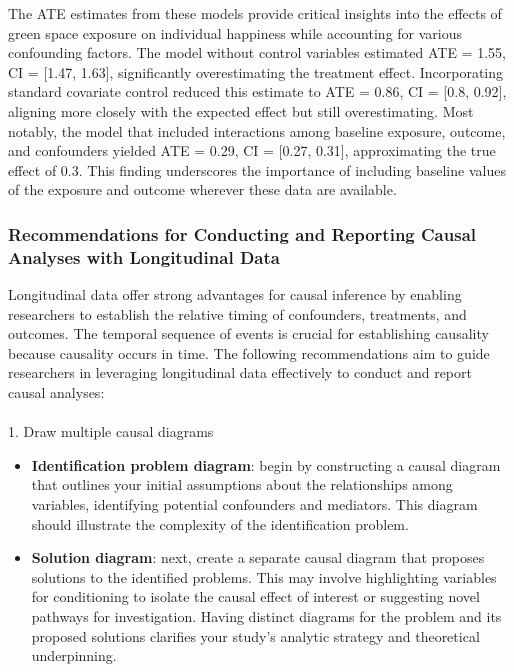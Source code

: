 \documentclass[
  single column]{article}
\makeatletter
\let\oldparagraph\paragraph
\renewcommand{\paragraph}{
    \@ifstar
      \xxxParagraphStar
      \xxxParagraphNoStar
  }
\newcommand{\xxxParagraphStar}[1]{\oldparagraph*{#1}\mbox{}}
\newcommand{\xxxParagraphNoStar}[1]{\oldparagraph{#1}\mbox{}}
\providecommand{\tightlist}{%
  \setlength{\itemsep}{0pt}\setlength{\parskip}{0pt}}\usepackage{longtable,booktabs,array}
\makeatother
\begin{document}
The ATE estimates from these models provide critical insights into the
effects of green space exposure on individual happiness while accounting
for various confounding factors. The model without control variables
estimated ATE = 1.55, CI = {[}1.47, 1.63{]}, significantly
overestimating the treatment effect. Incorporating standard covariate
control reduced this estimate to ATE = 0.86, CI = {[}0.8, 0.92{]},
aligning more closely with the expected effect but still overestimating.
Most notably, the model that included interactions among baseline
exposure, outcome, and confounders yielded ATE = 0.29, CI = {[}0.27,
0.31{]}, approximating the true effect of 0.3. This finding underscores
the importance of including baseline values of the exposure and outcome
wherever these data are available.

\subsubsection{Recommendations for Conducting and Reporting Causal
Analyses with Longitudinal
Data}\label{recommendations-for-conducting-and-reporting-causal-analyses-with-longitudinal-data}

Longitudinal data offer strong advantages for causal inference by
enabling researchers to establish the relative timing of confounders,
treatments, and outcomes. The temporal sequence of events is crucial for
establishing causality because causality occurs in time. The following
recommendations aim to guide researchers in leveraging longitudinal data
effectively to conduct and report causal analyses:

\paragraph{1. Draw multiple causal
diagrams}\label{draw-multiple-causal-diagrams-1}

\begin{itemize}
\tightlist
\item
  \textbf{Identification problem diagram}: begin by constructing a
  causal diagram that outlines your initial assumptions about the
  relationships among variables, identifying potential confounders and
  mediators. This diagram should illustrate the complexity of the
  identification problem.
\item
  \textbf{Solution diagram}: next, create a separate causal diagram that
  proposes solutions to the identified problems. This may involve
  highlighting variables for conditioning to isolate the causal effect
  of interest or suggesting novel pathways for investigation. Having
  distinct diagrams for the problem and its proposed solutions clarifies
  your study's analytic strategy and theoretical underpinning.
\end{itemize}
\end{document}

